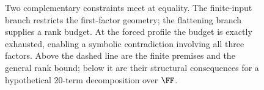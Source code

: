 \begin{figure}[tbp]
  \centering
  \makebox[\linewidth][c]{\unskip}
  \caption{Two complementary constraints meet at equality.
  The finite-input branch restricts the first-factor geometry; the
  flattening branch supplies a rank budget. At the forced profile the
  budget is exactly exhausted, enabling a symbolic contradiction involving
  all three factors. Above the dashed line are the finite premises and
  the general rank bound; below it are their structural consequences
  for a hypothetical 20-term decomposition over $\FF$.}
  \label{fig:proof-structure}
\end{figure}
\FloatBarrier
